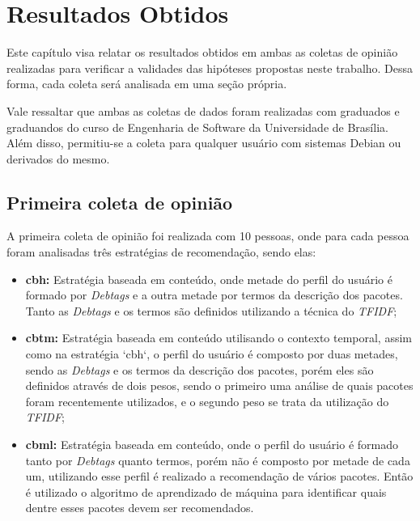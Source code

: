 \chapter[Resultados Obtidos]{Resultados Obtidos}

Este capítulo visa relatar os resultados obtidos em ambas as coletas de opinião
realizadas para verificar a validades das hipóteses propostas neste trabalho.
Dessa forma, cada coleta será analisada em uma seção própria.

Vale ressaltar que ambas as coletas de dados foram realizadas com graduados e
graduandos do curso de Engenharia de Software da Universidade de Brasília. Além
disso, permitiu-se a coleta para qualquer usuário com sistemas Debian ou
derivados do mesmo.

\section{Primeira coleta de opinião}

A primeira coleta de opinião foi realizada com 10 pessoas, onde para cada
pessoa foram analisadas três estratégias de recomendação, sendo elas:

\begin{itemize}
    \item \textbf{cbh:} Estratégia baseada em conteúdo, onde metade do
    perfil do usuário é formado por \textit{Debtags} e a outra metade por termos
    da descrição dos pacotes. Tanto as \textit{Debtags} e os termos são definidos
        utilizando a técnica do \textit{TFIDF};
    \item \textbf{cbtm:} Estratégia baseada em conteúdo utilisando o contexto
    temporal, assim como na estratégia `cbh`, o perfil do usuário é composto
    por duas metades, sendo as \textit{Debtags} e os termos da descrição dos pacotes,
    porém eles são definidos através de dois pesos, sendo o primeiro uma
    análise de quais pacotes foram recentemente utilizados, e o segundo peso
    se trata da utilização do \textit{TFIDF};
    \item \textbf{cbml:} Estratégia baseada em conteúdo, onde o perfil do
    usuário é formado tanto por \textit{Debtags} quanto termos, porém não é composto
    por metade de cada um, utilizando esse perfil é realizado a
    recomendação de vários pacotes. Então é utilizado o algoritmo de
    aprendizado de máquina para identificar quais dentre esses pacotes
    devem ser recomendados.
\end{itemize}

